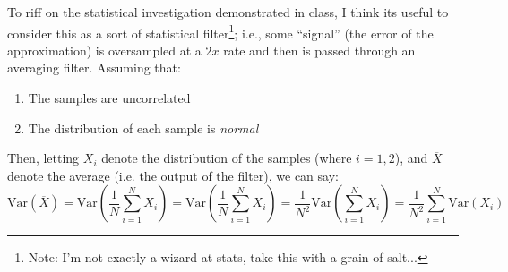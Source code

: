 \documentclass[11pt]{report}
\theoremstyle{definition}
\begin{document}
To riff on the statistical investigation demonstrated in class, I think its
useful to consider this as a sort of statistical filter\footnote{Note: I'm not
	exactly a wizard at stats, take this with a grain of salt...}; i.e., some
``signal'' (the error of the approximation) is oversampled at a $2x$ rate and then is
passed through an averaging filter. Assuming that:
\begin{enumerate}
	\item The samples are uncorrelated
	\item The distribution of each sample is \textit{normal}
\end{enumerate}
Then, letting $X_i$ denote the distribution of the samples (where $i=1,2$), and
$\overline{X}$ denote the average (i.e. the output of the filter), we can say:
\[
	\mathrm{Var}(\overline{X})
	= \mathrm{Var}\left(\frac{1}{N}\sum_{i=1}^N X_i\right)
	= \mathrm{Var}\left(\frac{1}{N}\sum_{i=1}^N X_i\right)
	= \frac{1}{N^2}\mathrm{Var}\left(\sum_{i=1}^N X_i\right)
	= \frac{1}{N^2}\sum_{i=1}^N \mathrm{Var}\left(X_i\right)
\]
\end{document}
